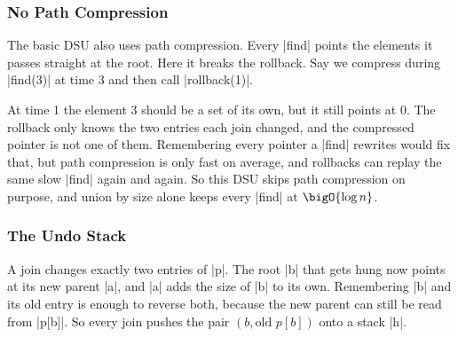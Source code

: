 \subsubsection{No Path Compression}
The basic DSU also uses path compression. Every \code|find| points the elements it passes straight at the root. Here it breaks the rollback. Say we compress during \code|find(3)| at time 3 and then call \code|rollback(1)|.

\begin{center}
\end{center}
At time 1 the element 3 should be a set of its own, but it still points at 0. The rollback only knows the two entries each join changed, and the compressed pointer is not one of them. Remembering every pointer a \code|find| rewrites would fix that, but path compression is only fast on average, and rollbacks can replay the same slow \code|find| again and again. So this DSU skips path compression on purpose, and union by size alone keeps every \code|find| at \(\bigO{\log n}\).

\subsubsection{The Undo Stack}
A join changes exactly two entries of \code|p|. The root \code|b| that gets hung now points at its new parent \code|a|, and \code|a| adds the size of \code|b| to its own. Remembering \code|b| and its old entry is enough to reverse both, because the new parent can still be read from \code|p[b]|. So every join pushes the pair \((b, \text{old } p[b])\) onto a stack \code|h|.

